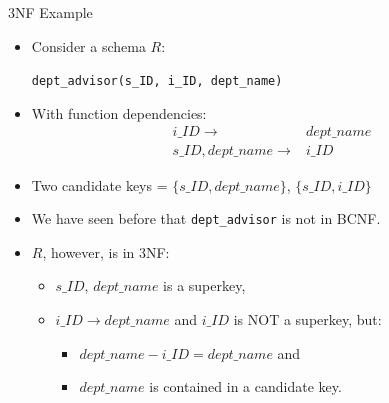 \documentclass[aspectratio=169]{beamer}
\begin{document}
\begin{frame}{3NF Example}
    \begin{itemize}
        \item Consider a schema $R$:
            \begin{center}
                \texttt{dept\_advisor(s\_ID, i\_ID, dept\_name)}
            \end{center}
        \item With function dependencies:
            \begin{equation*}
                \begin{align*}
                    i\_ID \rightarrow& dept\_name \\
                    s\_ID, dept\_name \rightarrow& i\_ID
                \end{align*}
            \end{equation*}
        \item Two candidate keys = $\{s\_ID, dept\_name\}$, $\{s\_ID, i\_ID\}$
        \item We have seen before that \texttt{dept\_advisor} is not in BCNF.
        \item $R$, however, is in 3NF:
            \begin{itemize}
                \item $s\_ID$, $dept\_name$ is a superkey,
                \item $i\_ID \rightarrow dept\_name$ and $i\_ID$ is NOT a superkey, but:
                    \begin{itemize}
                        \item ${dept\_name} - {i\_ID} = {dept\_name}$ and
                        \item $dept\_name$ is contained in a candidate key.
                    \end{itemize}
            \end{itemize}
    \end{itemize}
\end{frame}
\end{document}
